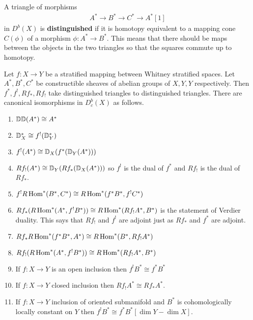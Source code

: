 \begin{definition}
    A triangle of morphisms
    \begin{align*}
        A^* \to B^* \to C^* \to A^*[1]
    \end{align*} in $D^b(X)$ is \textbf{distinguished} if it is homotopy equivalent to a mapping cone 
    $C(\phi)$ of a morphism $\phi:A^*\to B^*$. This means that there should be maps between 
    the objects in the two triangles so that the squares commute up to homotopy.
\end{definition}

\begin{theorem}
     Let $f:X\to Y$ be a 
    stratified mapping between Whitney stratified spaces. Let $A^*,
    B^*,C^*$ be constructible sheaves of abelian groups of $X,Y,Y$ respectively. Then 
    $f^*,f^!,Rf_*,Rf_!$ take distinguished triangles to distinguished triangles. There
    are canonical isomorphisms in $D^b_c(X)$ as follows.

    \begin{enumerate}
        \item $\mathbb{D}\mathbb{D}(A^*) \cong A^*$
        \item $\mathbb{D}^*_X \cong f^!(\mathbb{D}^*_Y)$
        \item $f^!(A^*) \cong \mathbb{D}_X(f^*(\mathbb{D}_Y(A^*)))$
        \item $Rf_!(A^*) \cong \mathbb{D}_Y(Rf_*(\mathbb{D}_X(A^*)))$ so $f^!$ is the dual of $f^*$
        and $Rf_!$ is the dual of $Rf_*$.
        \item $f^!R\operatorname{Hom}^*(B^*,C^*) \cong R\operatorname{Hom}^*(f^*B^*,f^!C^*)$
        \item $Rf_*(R\operatorname{Hom}^*(A^*,f^!B^*)) \cong R\operatorname{Hom}^*(Rf_!A^*,B^*)$ is the statement of Verdier
        duality. This says that $Rf_!$ and $f^!$ are adjoint just as $Rf_*$ and $f^*$ are adjoint.
        \item $Rf_*R\operatorname{Hom}^*(f^*B^*,A^*) \cong R\operatorname{Hom}^*(B^*,Rf_!A^*)$
        \item $Rf_!(R\operatorname{Hom}^*(A^*,f^!B^*)) \cong R\operatorname{Hom}^*(Rf_!A^*,B^*)$
        \item If $f:X\to Y$ is an open inclusion then $f^!B^* \cong f^*B^*$ 
        \item If $f:X\to Y$ closed inclusion then $Rf_!A^* \cong Rf_*A^*$.
        \item If $f:X\to Y$ inclusion of oriented submanifold and $B^*$ is 
        cohomologically locally constant on $Y$ then $f^!B^* \cong f^*B^*[\dim Y - \dim X]$.
    \end{enumerate}
\end{theorem}